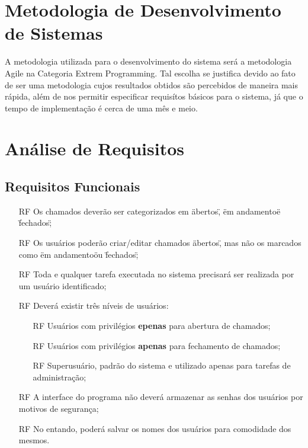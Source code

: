 \documentclass[12pt,openright,a4paper, article]{abntex2}
\begin{document}
\section {Metodologia de Desenvolvimento de Sistemas}
    A metodologia utilizada para o desenvolvimento do sistema será a metodologia Agile na Categoria Extrem Programming. Tal escolha se justifica devido ao fato de ser uma metodologia cujos resultados obtidos são percebidos de maneira mais rápida, além de nos permitir especificar requisítos básicos para o sistema, já que o tempo de implementação é cerca de uma mês e meio.

\section {Análise de Requisitos}
    \subsection{Requisitos Funcionais}
    \begin{enumerate}
        \item[RF] Os chamados deverão ser categorizados em \"abertos\", \"em andamento\" e \"fechados\";
        \item[RF] Os usuários poderão criar/editar chamados \"abertos\", mas não os marcados como \"em andamento\" ou \"fechados\";
        \item[RF] Toda e qualquer tarefa executada no sistema precisará ser realizada por um usuário identificado;
        \item[RF] Deverá existir três níveis de usuários:
        \begin{itemize}
            \item[RF] Usuários com privilégios \textbf{epenas} para abertura de chamados;
            \item[RF] Usuários com privilégios \textbf{apenas} para fechamento de chamados;
            \item[RF] Superusuário, padrão do sistema e utilizado apenas para tarefas de administração;
        \end{itemize}
        \item[RF] A interface do programa não deverá armazenar as senhas dos usuários por motivos de segurança;
        \item[RF] No entando, poderá salvar os nomes dos usuários para comodidade dos mesmos.
    \end{enumerate}
    
\end{document}
